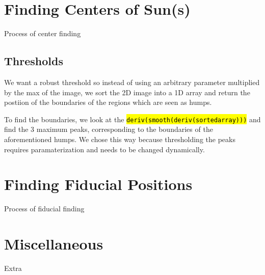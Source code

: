 \documentclass[10pt]{article}
\begin{document}

\section{Finding Centers of Sun(s)} %
\label{sec:finding_centers_of_sun}
Process of center finding
\subsection{Thresholds} %
\label{sub:thresholds}
We want a robust threshold so instead of using an arbitrary parameter multiplied by the max of the image, we sort the 2D image into a 1D array and return the postiion of the boundaries of the regions which are seen as humps.

To find the boundaries, we look at the \hl{\texttt{deriv(smooth(deriv(sortedarray)))}} and find the 3 maximum peaks, corresponding to the boundaries of the aforementioned humps. We chose this way because thresholding the peaks requires paramaterization and needs to be changed dynamically. 

\section{Finding Fiducial Positions} %
\label{sec:finding_fiducial_positions}
Process of fiducial finding

\section{Miscellaneous} %
\label{sec:miscellaneous}
Extra
\end{document}
